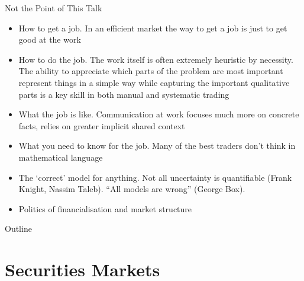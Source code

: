 \documentclass{beamer}
\newcommand{\sectionquote}[1]{\def\insertsquote{#1}}
\newcommand{\insertsquote}{}
\renewcommand{\insertsquote}{}
\begin{document}
\begin{frame}{Not the Point of This Talk}
	\begin{itemize}
		\item How to get a job. In an efficient market the way to get a job is just to get good at the work
		\item How to do the job. The work itself is often extremely heuristic by necessity. The ability to appreciate which parts of the problem are most important represent things in a simple way while capturing the important qualitative parts is a key skill in both manual and systematic trading
		\item What the job is like. Communication at work focuses much more on concrete facts, relies on greater implicit shared context
		\item What you need to know for the job. Many of the best traders don't think in mathematical language
		\item The `correct' model for anything. Not all uncertainty is quantifiable (Frank Knight, Nassim Taleb). ``All models are wrong'' (George Box).
		\item Politics of financialisation and market structure
	\end{itemize}

\end{frame}
\begin{frame}{Outline}
	\tableofcontents
\end{frame}

\sectionquote{``Governing by the power of virtue can be compared to the pole star, which remains fixed in place while all the other stars orbit respectfully around it.'' Confucius}
\section{Securities Markets}
\end{document}
